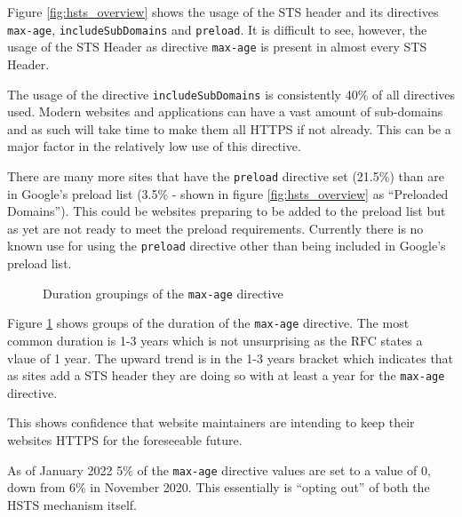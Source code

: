 \documentclass{mscreport}
\begin{document}
\noindent
Figure \ref{fig:hsts_overview} shows the usage of the STS header and its directives \texttt{max-age},  \texttt{includeSubDomains} and \texttt{preload}. It is difficult to see, however, the usage of the STS Header as directive \texttt{max-age} is present in almost every STS Header.

\vspace{0.3cm} \noindent
The usage of the directive \texttt{includeSubDomains} is consistently 40\% of all directives used. Modern websites and applications can have a vast amount of sub-domains and as such will take time to make them all HTTPS if not already. This can be a major factor in the relatively low use of this directive.

\vspace{0.3cm} \noindent
There are many more sites that have the \texttt{preload} directive set (21.5\%) than are in Google's preload list (3.5\% - shown in figure \ref{fig:hsts_overview} as ``Preloaded Domains''). This could be websites preparing to be added to the preload list but as yet are not ready to meet the preload requirements. Currently there is no known use for using the \texttt{preload} directive other than being included in Google's preload list.

\clearpage
\newpage

\begin{figure}[t]
	\begin{center}
		\caption{Duration groupings of the \texttt{max-age} directive}
		\label{fig:hsts_max-age}
	\end{center}
\end{figure}

\noindent
Figure \ref{fig:hsts_max-age} shows groups of the duration of the \texttt{max-age} directive. The most common duration is 1-3 years which is not unsurprising as the RFC states a vlaue of 1 year. The upward trend is in the 1-3 years bracket which indicates that as sites add a STS header they are doing so with at least a year for the \texttt{max-age} directive.

\vspace{0.3cm} \noindent
This shows confidence that website maintainers are intending to keep their websites HTTPS for the foreseeable future.

\vspace{0.3cm} \noindent
As of January 2022 5\% of the \texttt{max-age} directive values are set to a value of 0, down from 6\% in November 2020. This essentially is ``opting out'' of both the HSTS mechanism itself.
\end{document}
